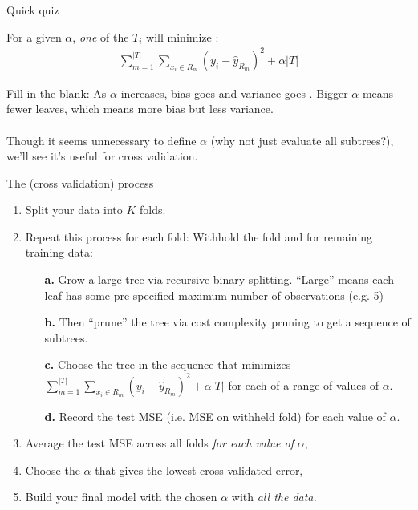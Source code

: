 \documentclass[mathserif, aspectratio=169]{beamer}
\begin{document}
\begin{frame}{Quick quiz}

For a given $\alpha$, \textit{one} of the $T_i$ will minimize :
\begin{align*}
\sum_{m=1}^{|T|} \sum_{x_i\in R_m} (y_i-\hat{y}_{R_m})^2+\alpha|T|
\end{align*}

Fill in the blank:  As $\alpha$ increases, bias goes \underline{} and variance goes \underline{}.  
%
\pause
%
Bigger $\alpha$ means fewer leaves, which means more bias but less variance.   \\~\\

Though it seems unnecessary to define $\alpha$ (why not just evaluate all subtrees?), we'll see it's useful for cross validation.  
\end{frame}

\begin{frame}{The (cross validation) process}

\begin{enumerate}
\item Split your data into $K$ folds.  
\vspace{3mm}
\item Repeat this process for each fold: Withhold the fold and for remaining training data:
\begin{enumerate}
\item[\textbf{a.}] Grow a large tree via recursive binary splitting.  ``Large'' means each leaf has some pre-specified maximum number of observations (e.g. 5)
\item[\textbf{b.}] Then ``prune'' the tree via cost complexity pruning to get a sequence of subtrees.  
\item[\textbf{c.}] Choose the tree in the sequence that minimizes $\sum_{m=1}^{|T|} \sum_{x_i\in R_m} (y_i-\hat{y}_{R_m})^2+\alpha|T|$ for each of a range of values of $\alpha$.
\item[\textbf{d.}] Record the test MSE (i.e. MSE on withheld fold) for each value of $\alpha$.
\vspace{3mm}
\end{enumerate}
\item Average the test MSE across all folds \textit{for each value of }$\alpha$, 
\vspace{3mm}
\item Choose the $\alpha$ that gives the lowest cross validated error, 
\vspace{3mm}
\item Build your final model with the chosen $\alpha$ with \textit{all the data.}
\end{enumerate}
\end{frame}
\end{document}
